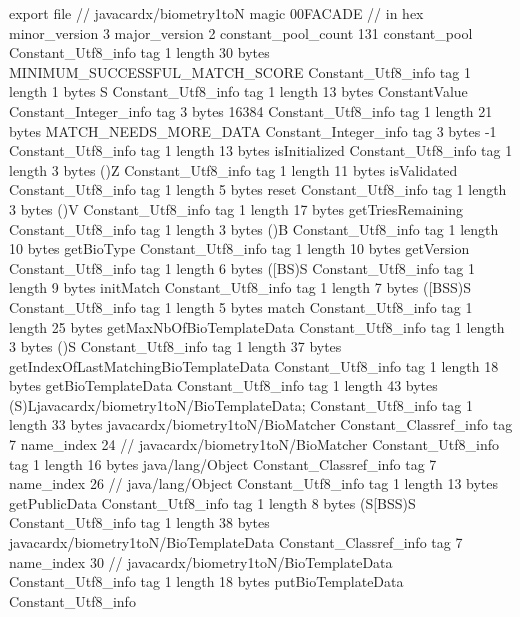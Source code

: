 export file {		// javacardx/biometry1toN
	magic	00FACADE		 // in hex
	minor_version	3
	major_version	2
	constant_pool_count	131
	constant_pool {
		Constant_Utf8_info {
			tag	1
			length	30
			bytes	MINIMUM_SUCCESSFUL_MATCH_SCORE
		}
		Constant_Utf8_info {
			tag	1
			length	1
			bytes	S
		}
		Constant_Utf8_info {
			tag	1
			length	13
			bytes	ConstantValue
		}
		Constant_Integer_info {
			tag	3
			bytes	16384
		}
		Constant_Utf8_info {
			tag	1
			length	21
			bytes	MATCH_NEEDS_MORE_DATA
		}
		Constant_Integer_info {
			tag	3
			bytes	-1
		}
		Constant_Utf8_info {
			tag	1
			length	13
			bytes	isInitialized
		}
		Constant_Utf8_info {
			tag	1
			length	3
			bytes	()Z
		}
		Constant_Utf8_info {
			tag	1
			length	11
			bytes	isValidated
		}
		Constant_Utf8_info {
			tag	1
			length	5
			bytes	reset
		}
		Constant_Utf8_info {
			tag	1
			length	3
			bytes	()V
		}
		Constant_Utf8_info {
			tag	1
			length	17
			bytes	getTriesRemaining
		}
		Constant_Utf8_info {
			tag	1
			length	3
			bytes	()B
		}
		Constant_Utf8_info {
			tag	1
			length	10
			bytes	getBioType
		}
		Constant_Utf8_info {
			tag	1
			length	10
			bytes	getVersion
		}
		Constant_Utf8_info {
			tag	1
			length	6
			bytes	([BS)S
		}
		Constant_Utf8_info {
			tag	1
			length	9
			bytes	initMatch
		}
		Constant_Utf8_info {
			tag	1
			length	7
			bytes	([BSS)S
		}
		Constant_Utf8_info {
			tag	1
			length	5
			bytes	match
		}
		Constant_Utf8_info {
			tag	1
			length	25
			bytes	getMaxNbOfBioTemplateData
		}
		Constant_Utf8_info {
			tag	1
			length	3
			bytes	()S
		}
		Constant_Utf8_info {
			tag	1
			length	37
			bytes	getIndexOfLastMatchingBioTemplateData
		}
		Constant_Utf8_info {
			tag	1
			length	18
			bytes	getBioTemplateData
		}
		Constant_Utf8_info {
			tag	1
			length	43
			bytes	(S)Ljavacardx/biometry1toN/BioTemplateData;
		}
		Constant_Utf8_info {
			tag	1
			length	33
			bytes	javacardx/biometry1toN/BioMatcher
		}
		Constant_Classref_info {
			tag	7
			name_index	24		// javacardx/biometry1toN/BioMatcher
		}
		Constant_Utf8_info {
			tag	1
			length	16
			bytes	java/lang/Object
		}
		Constant_Classref_info {
			tag	7
			name_index	26		// java/lang/Object
		}
		Constant_Utf8_info {
			tag	1
			length	13
			bytes	getPublicData
		}
		Constant_Utf8_info {
			tag	1
			length	8
			bytes	(S[BSS)S
		}
		Constant_Utf8_info {
			tag	1
			length	38
			bytes	javacardx/biometry1toN/BioTemplateData
		}
		Constant_Classref_info {
			tag	7
			name_index	30		// javacardx/biometry1toN/BioTemplateData
		}
		Constant_Utf8_info {
			tag	1
			length	18
			bytes	putBioTemplateData
		}
		Constant_Utf8_info {
}}}
